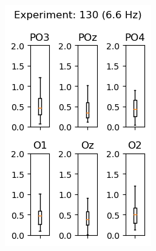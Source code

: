 \begin{figure}[ht]
    \centering
    \begin{subfigure}{0.25\linewidth}
        \includegraphics[width=\linewidth]{images/appendix/13066.png}
        \label{fig:13066}
    \end{subfigure}
    \begin{subfigure}{0.25\linewidth}

\end{subfigure}
\end{figure}
